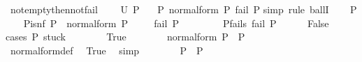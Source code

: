 \begin{isabellebody}
\isanewline
\isanewline
\isanewline
\isanewline
{}\isamarkupfalse%
\ not{\isacharunderscore}{\kern0pt}empty{\isacharunderscore}{\kern0pt}then{\isacharunderscore}{\kern0pt}not{\isacharunderscore}{\kern0pt}fail{\isacharcolon}{\kern0pt}\ \isanewline
\ \ \ {\isachardoublequoteopen}U\ P{}{\isasymnoteq}{\isacharbraceleft}{\kern0pt}{\isacharbraceright}{\kern0pt}{\isachardoublequoteclose}\isanewline
\ \ \ {\isachardoublequoteopen}{\isasymnot}{\isacharparenleft}{\kern0pt}{\isasymexists}P{\isasymin}\ normal{\isacharunderscore}{\kern0pt}form\ P{}{\isachardot}{\kern0pt}\ fail\ P{\isacharparenright}{\kern0pt}{\isachardoublequoteclose}\isanewline
%
\isadelimproof
%
\endisadelimproof
%
\isatagproof
{}\isamarkupfalse%
{\isacharparenleft}{\kern0pt}simp{\isacharcomma}{\kern0pt}\ rule\ ballI{\isacharparenright}{\kern0pt}\isanewline
\ \ \isamarkupfalse%
\ P\isanewline
\ \ \isamarkupfalse%
\ P{\isacharunderscore}{\kern0pt}is{\isacharunderscore}{\kern0pt}nf{\isacharcolon}{\kern0pt}\ {\isachardoublequoteopen}P\ {\isasymin}\ normal{\isacharunderscore}{\kern0pt}form\ P{}{\isachardoublequoteclose}\isanewline
\ \ \isamarkupfalse%
\ {\isachardoublequoteopen}{\isasymnot}\ fail\ P{\isachardoublequoteclose}\isanewline
\ \ \isamarkupfalse%
\isanewline
\ \ \ \ \isamarkupfalse%
\ P{\isacharunderscore}{\kern0pt}fails{\isacharcolon}{\kern0pt}\ {\isachardoublequoteopen}fail\ P{\isachardoublequoteclose}\isanewline
\ \ \ \ \isamarkupfalse%
\ False\isanewline
\ \ \ \ \isamarkupfalse%
{\isacharparenleft}{\kern0pt}cases\ {\isachardoublequoteopen}P{}{\isasymin}\ stuck{\isachardoublequoteclose}{\isacharparenright}{\kern0pt}\isanewline
\ \ \ \ \ \ \isamarkupfalse%
\ True\isanewline
\ \ \ \ \ \ \isamarkupfalse%
\ {\isachardoublequoteopen}normal{\isacharunderscore}{\kern0pt}form\ P{}\ {\isacharequal}{\kern0pt}\ {\isacharbraceleft}{\kern0pt}P{}{\isacharbraceright}{\kern0pt}{\isachardoublequoteclose}\isanewline
\ \ \ \ \ \ \ \ \isamarkupfalse%
\ normal{\isacharunderscore}{\kern0pt}form{\isacharunderscore}{\kern0pt}def\ \isamarkupfalse%
\ True\ \isamarkupfalse%
\ simp\isanewline
\ \ \ \ \ \ \isamarkupfalse%
\ {\isachardoublequoteopen}P\ {\isacharequal}{\kern0pt}\ P{}{\isachardoublequoteclose}\ \isamarkupfalse%

\end{isabellebody}
